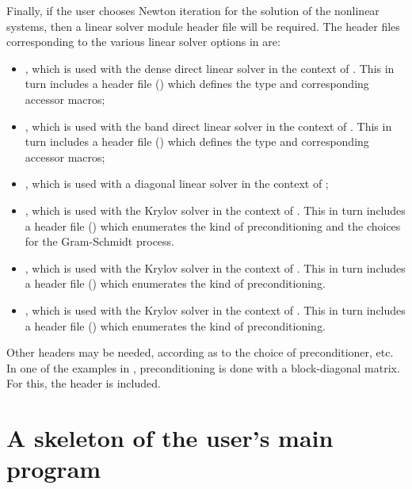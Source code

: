Finally, if the user chooses Newton iteration for the solution of the nonlinear
systems, then a linear solver module header file will be required. 
The header files corresponding to the various linear solver options in
{\cvode} are:
\begin{itemize}
\item {}, 
  which is used with the dense direct linear solver in 
  the context of {\cvode}. This in turn includes a header file ()
  which defines the  type and corresponding accessor macros; 
\item {}, 
  which is used with the band direct linear solver in the
  context of {\cvode}. This in turn includes a header file ()
  which defines the  type and corresponding accessor macros;
\item {}, which is used with a diagonal linear solver in the
  context of {\cvode};
\item {}, 
  which is used with the Krylov solver {\spgmr} in the
  context of {\cvode}. This in turn includes a header file ()
  which enumerates the kind of preconditioning and the choices for the
  Gram-Schmidt process.
\item {}, 
  which is used with the Krylov solver {\spbcg} in the
  context of {\cvode}. This in turn includes a header file ()
  which enumerates the kind of preconditioning.
\item {}, 
  which is used with the Krylov solver {\sptfqmr} in the
  context of {\cvode}. This in turn includes a header file ()
  which enumerates the kind of preconditioning.
\end{itemize}

Other headers may be needed, according as to the choice of preconditioner,
etc. In one of the examples in \cite{cvode2.2.0_ex}, preconditioning is done
with a block-diagonal matrix. For this, the header
 is included.

\section{A skeleton of the user's main program}\label{ss:skeleton_sim}

